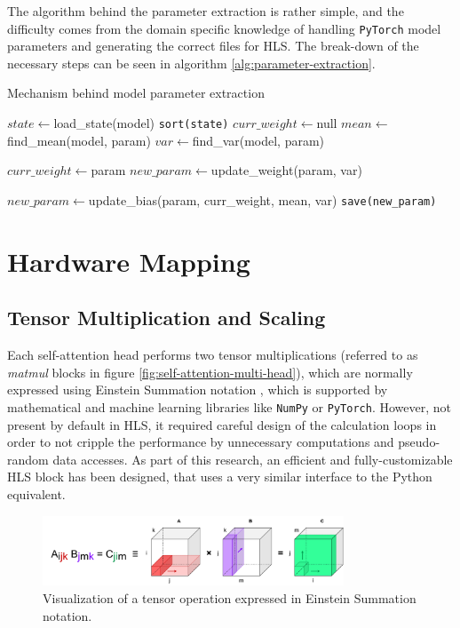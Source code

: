 The algorithm behind the parameter extraction is rather simple, and the difficulty comes from the domain specific knowledge of handling \texttt{PyTorch} model parameters and generating the correct files for HLS. The break-down of the necessary steps can be seen in algorithm \ref{alg:parameter-extraction}.

\begin{algorithm}
  \caption{Mechanism behind model parameter extraction}\label{alg:parameter-extraction}
  \begin{algorithmic}[1]
    \State $state \gets $load\_state(model)
    \State \texttt{sort(state)}
    \State $curr\_weight \gets $null
      \State $mean \gets $find\_mean(model, param)
      \State $var \gets $find\_var(model, param)

        \State $curr\_weight \gets $param
        \State $new\_param \gets $update\_weight(param, var)

      \Else
        
        \State $new\_param \gets $update\_bias(param, curr\_weight, mean, var)
      \EndIf
      \State \texttt{save(new\_param)}
    \EndFor
  \end{algorithmic}
\end{algorithm}


\section{Hardware Mapping}


\subsection{Tensor Multiplication and Scaling}
Each self-attention head performs two tensor multiplications (referred to as \textit{matmul} blocks in figure \ref{fig:self-attention-multi-head}), which are normally expressed using Einstein Summation notation \cite{59-barr1991einstein}, which is supported by mathematical and machine learning libraries like \texttt{NumPy} or \texttt{PyTorch}. However, not present by default in HLS, it required careful design of the calculation loops in order to not cripple the performance by unnecessary computations and pseudo-random data accesses. As part of this research, an efficient and fully-customizable HLS block has been designed, that uses a very similar interface to the Python equivalent.

\begin{figure}[hpt!]
  \centering
  \includegraphics[trim={0cm 0cm 0cm 0cm}, width=0.8\textwidth, center]{models/einsum.pdf}
  \caption{Visualization of a tensor operation expressed in Einstein Summation notation.}
  \label{fig:einsum}
\end{figure}

